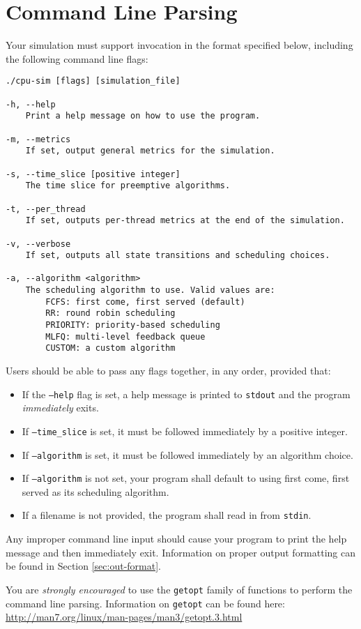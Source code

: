\documentclass[main.tex]{subfiles}
\begin{document}
\section{Command Line Parsing}
\label{sec:cmd-line}

Your simulation must support invocation in the format specified below, including the following command line flags:

\begin{verbatim}
./cpu-sim [flags] [simulation_file]

-h, --help
    Print a help message on how to use the program.
    
-m, --metrics
    If set, output general metrics for the simulation.
    
-s, --time_slice [positive integer]
    The time slice for preemptive algorithms.
    
-t, --per_thread
    If set, outputs per-thread metrics at the end of the simulation.
    
-v, --verbose
    If set, outputs all state transitions and scheduling choices.
    
-a, --algorithm <algorithm>
    The scheduling algorithm to use. Valid values are:
        FCFS: first come, first served (default)
        RR: round robin scheduling
        PRIORITY: priority-based scheduling
        MLFQ: multi-level feedback queue
        CUSTOM: a custom algorithm
\end{verbatim}

Users should be able to pass any flags together, in any order, provided that:

\begin{itemize}
    \item If the \texttt{--help} flag is set, a help message is printed to \texttt{stdout} and the program \textit{immediately} exits.
    \item If \texttt{--time\_slice} is set, it must be followed immediately by a positive integer.
    \item If \texttt{--algorithm} is set, it must be followed immediately by an algorithm choice.
    \item If \texttt{--algorithm} is not set, your program shall default to using first come, first served as its scheduling algorithm.
    \item If a filename is not provided, the program shall read in from \texttt{stdin}.
\end{itemize}

Any improper command line input should cause your program to print the help message and then immediately exit. Information on proper output formatting can be found in Section \ref{sec:out-format}.

You are \emph{strongly encouraged} to use the \texttt{getopt} family of functions to perform the command line parsing. Information on \texttt{getopt} can be found here: \url{http://man7.org/linux/man-pages/man3/getopt.3.html}
\end{document}
